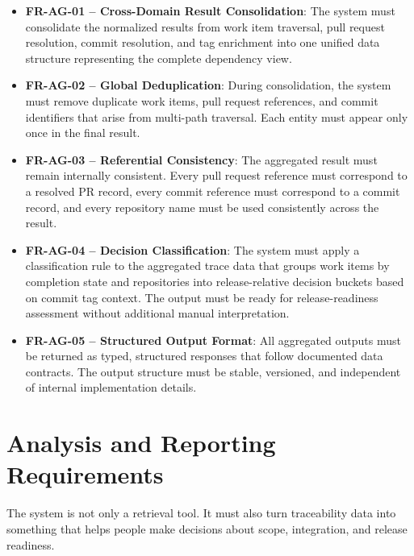 \begin{itemize}
  \item \textbf{FR-AG-01 -- Cross-Domain Result Consolidation}: The system must consolidate the normalized results from work item traversal, pull request resolution, commit resolution, and tag enrichment into one unified data structure representing the complete dependency view.

  \item \textbf{FR-AG-02 -- Global Deduplication}: During consolidation, the system must remove duplicate work items, pull request references, and commit identifiers that arise from multi-path traversal. Each entity must appear only once in the final result.

  \item \textbf{FR-AG-03 -- Referential Consistency}: The aggregated result must remain internally consistent. Every pull request reference must correspond to a resolved PR record, every commit reference must correspond to a commit record, and every repository name must be used consistently across the result.

  \item \textbf{FR-AG-04 -- Decision Classification}: The system must apply a classification rule to the aggregated trace data that groups work items by completion state and repositories into release-relative decision buckets based on commit tag context. The output must be ready for release-readiness assessment without additional manual interpretation.

  \item \textbf{FR-AG-05 -- Structured Output Format}: All aggregated outputs must be returned as typed, structured responses that follow documented data contracts. The output structure must be stable, versioned, and independent of internal implementation details.
\end{itemize}

\section{Analysis and Reporting Requirements}
\label{sec:req-analysis}

The system is not only a retrieval tool. It must also turn traceability data
into something that helps people make decisions about scope, integration, and
release readiness.

